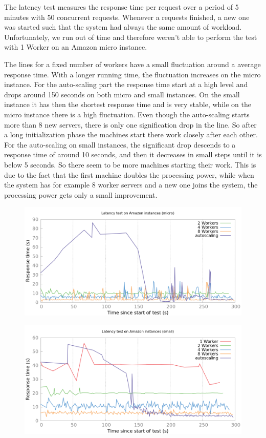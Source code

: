\documentclass[paper=a4, fontsize=11pt]{scrartcl} %
\numberwithin{equation}{section} %
\numberwithin{figure}{section} %
\numberwithin{table}{section} %
\begin{document}
The latency test measures the response time per request over a period of 5 minutes with 50 concurrent requests. Whenever a requests finished, a new one was started such that the system had always the same amount of workload.
Unfortunately, we run out of time and therefore weren't able to perform the test with 1 Worker on an Amazon micro instance.

The lines for a fixed number of workers have a small fluctuation around a average response time. With a longer running time, the fluctuation increases on the micro instance. For the auto-scaling part the response time start at a high level and drops around 150 seconds on both micro and small instances. On the small instance it has then the shortest response time and is very stable, while on the micro instance there is a high fluctuation. Even though the auto-scaling starts more than 8 new servers, there is only one signification drop in the line. So after a long initialization phase the machines start there work closely after each other. For the auto-scaling on small instances, the significant drop descends to a response time of around 10 seconds, and then it decreases in small steps until it is below 5 seconds. So there seem to be more machines starting their work. This is due to the fact that the first machine doubles the processing power, while when the system has for example 8 worker servers and a new one joins the system, the processing power gets only a small improvement.

\begin{figure}[h!]
\includegraphics[width=\columnwidth]{../plot/timeline.png}
\end{figure}

\begin{figure}[h!]
\includegraphics[width=\columnwidth]{../plot/timeline_small.png}
\end{figure}
\end{document}
